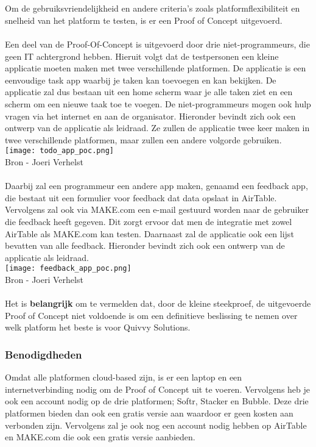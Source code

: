 \chapter{}%
\label{ch:proof-of-concept}
Om de gebruiksvriendelijkheid en andere criteria's zoals platformflexibiliteit en snelheid van het platform te testen, is er een Proof of Concept uitgevoerd. 
\\
\\
Een deel van de Proof-Of-Concept is uitgevoerd door drie niet-programmeurs, die geen IT achtergrond hebben. Hieruit volgt dat de testpersonen
een kleine applicatie moeten maken met twee verschillende platformen. De applicatie is een eenvoudige task app waarbij je taken kan toevoegen en kan bekijken.
De applicatie zal dus bestaan uit een home scherm waar je alle taken ziet en een scherm om een nieuwe taak toe te voegen. De niet-programmeurs mogen ook hulp vragen via het internet en aan de organisator.
Hieronder bevindt zich ook een ontwerp van de applicatie als leidraad. Ze zullen de applicatie twee keer maken in twee verschillende platformen, maar zullen een andere volgorde gebruiken.
\\
\texttt{[image: todo\_app\_poc.png]}
\\
Bron - Joeri Verhelst 
\\
\\
Daarbij zal een programmeur een andere app maken, genaamd een feedback app, die bestaat uit een formulier voor feedback dat data opslaat in AirTable.
Vervolgens zal ook via MAKE.com een e-mail gestuurd worden naar de gebruiker die feedback heeft gegeven.
Dit zorgt ervoor dat men de integratie met zowel AirTable als MAKE.com kan testen. Daarnaast zal de applicatie ook een lijst bevatten van alle feedback.
Hieronder bevindt zich ook een ontwerp van de applicatie als leidraad.
\\
\texttt{[image: feedback\_app\_poc.png]}
\\
Bron - Joeri Verhelst 
\\
\\
Het is \textbf{belangrijk} om te vermelden dat, door de kleine steekproef, de uitgevoerde Proof of Concept niet voldoende is om een 
definitieve beslissing te nemen over welk platform het beste is voor Quivvy Solutions.

\subsection{Benodigdheden}%
\label{subsec:benodigdheden}
Omdat alle platformen cloud-based zijn, is er een laptop en een internetverbinding nodig om de Proof of Concept uit te voeren. Vervolgens heb je ook 
een account nodig op de drie platformen; Softr, Stacker en Bubble. Deze drie platformen bieden dan ook een gratis versie aan waardoor er geen kosten aan verbonden zijn. Vervolgens zal je ook 
nog een account nodig hebben op AirTable en MAKE.com die ook een gratis versie aanbieden.

